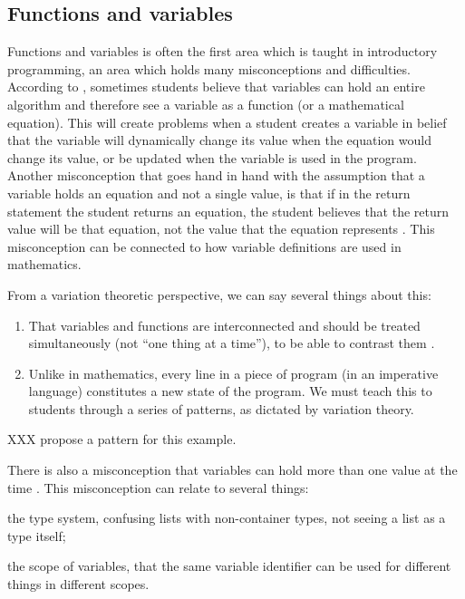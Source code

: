 \subsection{Functions and variables}

Functions and variables is often the first area which is taught in introductory programming, an area which holds many misconceptions and difficulties. According to \textcite{Kohn2017VariableEvaluation,Plass2015Variables,Doukakis2007}, 
sometimes students believe that variables can hold an entire algorithm and 
therefore see a variable as a function (or a mathematical equation). This will 
create problems when a student creates a variable in belief that the variable 
will dynamically change its value when the equation would change its value, or be updated
when the variable is used in the program. Another misconception that goes hand in hand with the assumption that a 
variable holds an equation and not a single value, is that if in the return 
statement the student returns an equation, the student believes that the return 
value will be that equation, not the value that the equation represents 
\parencite{Kohn2017VariableEvaluation}.
This misconception can be 
connected to how variable definitions are used in mathematics. 

From a variation theoretic perspective, we can say several things about this:
\begin{enumerate}
  \item That variables and functions are interconnected and should be treated 
    simultaneously (not \enquote{one thing at a time}), to be able to contrast 
    them \parencite[\cf][Ch~6, pp~167--168]{NCOL}.
  \item Unlike in mathematics, every line in a piece of program (in an 
    imperative language) constitutes a new state of the program.
    We must teach this to students through a series of patterns, as dictated by 
    variation theory.
\end{enumerate}

XXX propose a pattern for this example.

There is also a misconception that variables can hold more than one value at 
the time \parencite{Doukakis2007}.
This misconception can relate to several things:
\begin{enumerate*}
  \item the type system, confusing lists with non-container types, not seeing a 
    list as a type itself;
  \item the scope of variables, that the same variable identifier can be used 
    for different things in different scopes.
\end{enumerate*}

